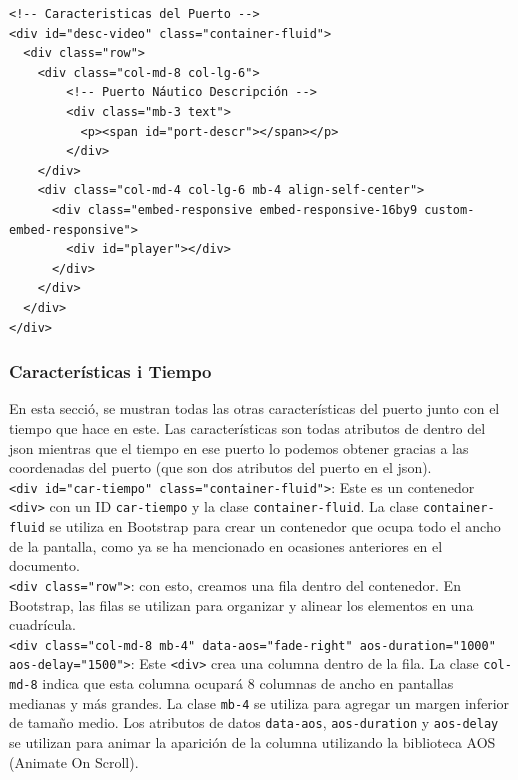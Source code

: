 \documentclass{article}
\begin{document}
\begin{verbatim}
<!-- Caracteristicas del Puerto -->
<div id="desc-video" class="container-fluid">
  <div class="row">
    <div class="col-md-8 col-lg-6">
        <!-- Puerto Náutico Descripción -->
        <div class="mb-3 text">
          <p><span id="port-descr"></span></p>
        </div>
    </div>
    <div class="col-md-4 col-lg-6 mb-4 align-self-center">
      <div class="embed-responsive embed-responsive-16by9 custom-embed-responsive">
        <div id="player"></div>
      </div>
    </div>
  </div>
</div>
\end{verbatim}

\subsubsection{Características i Tiempo}
En esta secció, se mustran todas las otras características del puerto junto con el tiempo que hace en este. Las características son todas atributos de dentro del json mientras que el tiempo en ese puerto lo podemos obtener gracias a las coordenadas del puerto (que son dos atributos del puerto en el json).\\ 

\noindent\texttt{<div id="car-tiempo" class="container-fluid">}: Este es un contenedor \texttt{<div>} con un ID \texttt{car-tiempo} y la clase \texttt{container-fluid}. La clase \texttt{container-fluid} se utiliza en Bootstrap para crear un contenedor que ocupa todo el ancho de la pantalla, como ya se ha mencionado en ocasiones anteriores en el documento.\\

\noindent\texttt{<div class="row">}: con esto, creamos una fila dentro del contenedor. En Bootstrap, las filas se utilizan para organizar y alinear los elementos en una cuadrícula.\\

\noindent\texttt{<div class="col-md-8 mb-4" data-aos="fade-right" aos-duration="1000" aos-delay="1500">}: Este \texttt{<div>} crea una columna dentro de la fila. La clase \texttt{col-md-8} indica que esta columna ocupará 8 columnas de ancho en pantallas medianas y más grandes. La clase \texttt{mb-4} se utiliza para agregar un margen inferior de tamaño medio. Los atributos de datos \texttt{data-aos}, \texttt{aos-duration} y \texttt{aos-delay} se utilizan para animar la aparición de la columna utilizando la biblioteca AOS (Animate On Scroll).\\
\end{document}
